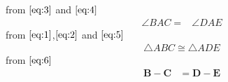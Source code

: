 \documentclass[10pt]{article}
\let\vec\mathbf{}
\begin{document}
from $\eqref{eq:3}$ and $\eqref{eq:4}$
\begin{align}
\angle BAC=&\angle DAE
\label{eq:5}
\end{align}
from $\eqref{eq:1}$,$\eqref{eq:2}$ and $\eqref{eq:5}$\\
\begin{align}
\triangle{ABC} \cong \triangle{ADE}
\label{eq:6}
\end{align} 
from $\eqref{eq:6}$\\
\begin{align}   
\vec{B}-\vec{C} &= \vec{D}-\vec{E}
\end{align}
\end{document}

